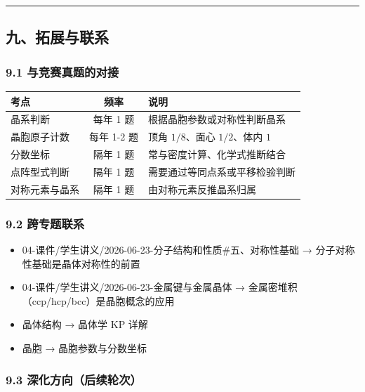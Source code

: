 \documentclass[a4paper,11pt]{ctexart}
\providecommand{\tightlist}{\setlength{\itemsep}{0pt}\setlength{\parskip}{0pt}}
\newcounter{none}
\begin{document}
\begin{center}\rule{0.5\linewidth}{0.5pt}\end{center}

\subsection{九、拓展与联系}\label{ux4e5dux62d3ux5c55ux4e0eux8054ux7cfb}

\subsubsection{9.1 与竞赛真题的对接}\label{ux4e0eux7adeux8d5bux771fux9898ux7684ux5bf9ux63a5}

{\def\LTcaptype{none} %
\begin{longtable}[]{@{}lcl@{}}
\toprule\noalign{}
考点 & 频率 & 说明 \\
\midrule\noalign{}
\endhead
\bottomrule\noalign{}
\endlastfoot
晶系判断 & 每年 1 题 & 根据晶胞参数或对称性判断晶系 \\
晶胞原子计数 & 每年 1-2 题 & 顶角 \(1/8\)、面心 \(1/2\)、体内 \(1\) \\
分数坐标 & 隔年 1 题 & 常与密度计算、化学式推断结合 \\
点阵型式判断 & 隔年 1 题 & 需要通过等同点系或平移检验判断 \\
对称元素与晶系 & 隔年 1 题 & 由对称元素反推晶系归属 \\
\end{longtable}
}

\subsubsection{9.2 跨专题联系}\label{ux8de8ux4e13ux9898ux8054ux7cfb}

\begin{itemize}
\tightlist
\item
  04-课件/学生讲义/2026-06-23-分子结构和性质\#五、对称性基础 → 分子对称性基础是晶体对称性的前置
\item
  04-课件/学生讲义/2026-06-23-金属键与金属晶体 → 金属密堆积（ccp/hcp/bcc）是晶胞概念的应用
\item
  晶体结构 → 晶体学 KP 详解
\item
  晶胞 → 晶胞参数与分数坐标
\end{itemize}

\subsubsection{9.3 深化方向（后续轮次）}\label{ux6df1ux5316ux65b9ux5411ux540eux7eedux8f6eux6b21}
\end{document}
